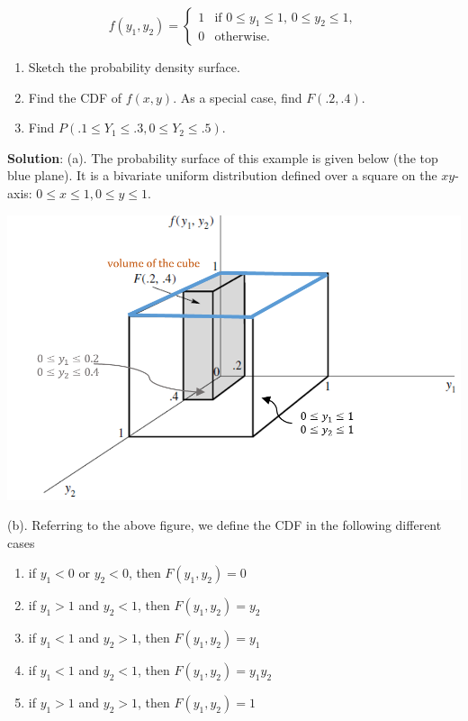 \documentclass[
]{book}
\providecommand{\tightlist}{%
  \setlength{\itemsep}{0pt}\setlength{\parskip}{0pt}}
\begin{document}
\[
\displaystyle f(y_1, y_2) = \begin{cases} 
 1 & \text{if $0 \le y_1 \le 1$, $0 \le y_2 \le 1$}, \\  
 0 & \text{otherwise}.
 \end{cases}
\]

\begin{enumerate}
\def\labelenumi{\alph{enumi}.}
\tightlist
\item
  Sketch the probability density surface.
\item
  Find the CDF of \(f(x,y)\). As a special case, find \(F(.2, .4)\).
\item
  Find \(P(.1 \le Y_1 \le .3, 0 \le Y_2 \le .5)\).
\end{enumerate}

\textbf{Solution}: (a). The probability surface of this example is given below (the top blue plane). It is a bivariate uniform distribution defined over a square on the \(xy\)-axis: \(0 \le x \le 1, 0 \le y \le 1\).

\begin{center}\includegraphics[width=0.6\linewidth]{topic06/bivariateUnifExample02} \end{center}

(b). Referring to the above figure, we define the CDF in the following different cases

\begin{enumerate}
\def\labelenumi{\arabic{enumi}.}
\item
  if \(y_1 <0\) or \(y_2 <0\), then \(F(y_1,y_2) = 0\)
\item
  if \(y_1 > 1\) and \(y_2 < 1\), then \(F(y_1, y_2) = y_2\)
\item
  if \(y_1 < 1\) and \(y_2 > 1\), then \(F(y_1, y_2) = y_1\)
\item
  if \(y_1 < 1\) and \(y_2 < 1\), then \(F(y_1, y_2) = y_1y_2\)
\item
  if \(y_1 > 1\) and \(y_2 > 1\), then \(F(y_1, y_2) = 1\)
\end{enumerate}
\end{document}
